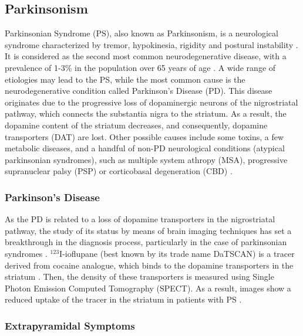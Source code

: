 \subsection{Parkinsonism}
Parkinsonian Syndrome (PS), also known as Parkinsonism, is a neurological syndrome characterized by tremor, hypokinesia, rigidity and postural instability \cite{Eckert2007}. It is considered as the second most common neurodegenerative disease, with a prevalence of 1-3\% in the population over 65 years of age \cite{Moghal1994}. A wide range of etiologies may lead to the PS, while the most common cause is the neurodegenerative condition called Parkinson's Disease (PD). This disease originates due to the progressive loss of dopaminergic neurons of the nigrostriatal pathway, which connects the substantia nigra to the striatum. As a result, the dopamine content of the striatum decreases, and consequently, dopamine transporters (DAT) are lost. Other possible causes include  some toxins, a few metabolic diseases, and a handful of non-PD neurological conditions (atypical parkinsonian syndromes), such as multiple system athropy (MSA), progressive supranuclear palsy (PSP) or corticobasal degeneration (CBD) \cite{Christine2004,tatsch2008extrapyramidal}. 

\subsubsection{Parkinson's Disease}
As the PD is related to a loss of dopamine transporters in the nigrostriatal pathway, the study of its status by means of brain imaging techniques has set a breakthrough in the diagnosis process, particularly in the  case of parkinsonian syndromes \cite{Eckert2007,Scherfler2009,Bhidayasiri2006}. $^{123}$I-ioflupane (best known by its trade name DaTSCAN) is a tracer derived from cocaine analogue, which binds to the dopamine transporters in the striatum \cite{Booij1998,Winogrodzka2003}. Then, the density of these transporters is measured using Single Photon Emission Computed Tomography (SPECT). As a result, images show a reduced uptake of the tracer in the striatum in patients with PS \cite{Bhidayasiri2006,PunalRioboo2007}. 
\subsubsection{Extrapyramidal Symptoms}
